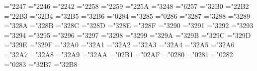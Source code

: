 

\let\cal=\undefined@
\let\mit=\undefined@
\let\oldstyle=\undefined@
\ifx\amstexloaded@\relax
 \let\oldnos=\undefined@
 \let\Cal=\undefined@
\fi


\mathchardef\triangleleft="2247
\mathchardef\triangleright="2246
\mathchardef\comp="2242
\mathchardef\setdif="2258
\mathchardef\cupprod="2259
\mathchardef\capprod="225A
\mathchardef\Relbar="3248
\mathchardef\colon="6257
\mathchardef\simarrow="32B0
\mathchardef\varland="22B2
\mathchardef\contraction="22B3
\mathchardef\coloneq="32B4
\mathchardef\eqcolon="32B5
\mathchardef\hateq="32B6
\mathchardef\hbar="0284
\mathchardef\notin="3285
\mathchardef\angle="0286
\mathchardef\doteq="3287
\mathchardef\models="3288
\mathchardef\bowtie="3289
\mathchardef\cong="328A
\mathchardef\hookleftarrow="328B
\mathchardef\hookrightarrow="328C
\mathchardef\longleftarrow="328D
\mathchardef\longrightarrow="328E
\mathchardef\Longleftarrow="328F
\mathchardef\Longrightarrow="3290
\mathchardef\mapsto="3291
\mathchardef\longmapsto="3292
\mathchardef\longleftrightarrow="3293
\mathchardef\Longleftrightarrow="3294
\mathchardef\rightleftharpoons="3295
\mathchardef\notless="3296 \let\nless=\notless
\mathchardef\notleq="3297 \let\nleq=\notleq
\mathchardef\notprec="3298 \let\nprec=\notprec
\mathchardef\notpreceq="3299 \let\npreceq=\notpreceq
\mathchardef\notsubset="329A \let\nsubset=\notsubset
\mathchardef\notsubseteq="329B \let\nsubseteq=\notsubseteq
\mathchardef\notsqsubseteq="329C \let\nsqsubseteq=\notsqsubseteq
\mathchardef\notgr="329D \let\ngtr=\notgr
\mathchardef\notgeq="329E \let\ngeq=\notgeq
\mathchardef\notsucc="329F \let\nsucc=\notsucc
\mathchardef\notsucceq="32A0 \let\nsucceq=\notsucceq
\mathchardef\notsupset="32A1 \let\nsupset=\notsupset
\mathchardef\notsupseteq="32A2 \let\nsupseteq=\notsupseteq
\mathchardef\notsqsupseteq="32A3 \let\nsqsupseteq=\notsqsupseteq
\mathchardef\neq="32A4 \let\ne=\neq
\mathchardef\notequiv="32A5
\mathchardef\notsim="32A6
\mathchardef\notsimeq="32A7
\mathchardef\notapprox="32A8
\mathchardef\notcong="32A9
\mathchardef\notasymp="32AA
\mathchardef\digamma="02B1 
\mathchardef\hslash="02AF
\mathchardef\openclubsuit="0280
\mathchardef\shadedclubsuit="0281
\mathchardef\openspadesuit="0282
\mathchardef\shadedspadesuit="0283
\mathchardef\circdashbullet="32B7
\mathchardef\bulletdashcirc="32B8

